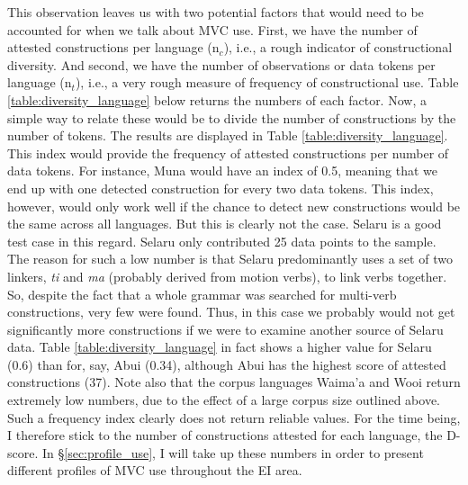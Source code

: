 This observation leaves us with two potential factors that would need to be accounted for when we talk about MVC use. First, we have the number of attested constructions per language (n$_c$), i.e., a rough indicator of constructional diversity. And second, we have the number of observations or data tokens per language (n$_t$), i.e., a very rough measure of frequency of constructional use. Table \ref{table:diversity_language} below returns the numbers of each factor. Now, a simple way to relate these would be to divide the number of constructions by the number of tokens. The results are displayed in Table \ref{table:diversity_language}. This index would provide the frequency of attested constructions per number of data tokens. For instance, Muna would have an index of 0.5, meaning that we end up with one detected construction for every two data tokens. This index, however, would only work well if the chance to detect new constructions would be the same across all languages. But this is clearly not the case. Selaru is a good test case in this regard. Selaru only contributed 25 data points to the sample. The reason for such a low number is that Selaru predominantly uses a set of two linkers, \textit{ti} and \textit{ma} (probably derived from motion verbs), to link verbs together. So, despite the fact that a whole grammar was searched for multi-verb constructions, very few were found. Thus, in this case we probably would not get significantly more constructions if we were to examine another source of Selaru data. Table \ref{table:diversity_language} in fact shows a higher value for Selaru (0.6) than for, say, Abui (0.34), although Abui has the highest score of attested constructions (37). Note also that the corpus languages Waima'a and Wooi return extremely low numbers, due to the effect of a large corpus size outlined above. Such a frequency index clearly does not return reliable values. For the time being, I therefore stick to the number of constructions attested for each language, the D-score. In §\ref{sec:profile_use}, I will take up these numbers in order to present different profiles of MVC use throughout the EI area.

